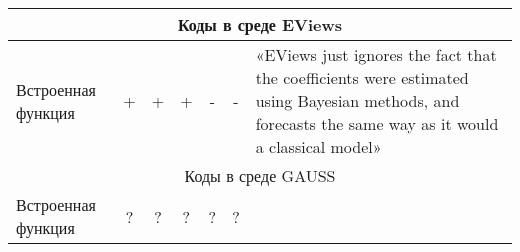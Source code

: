 \documentclass[11pt]{article} %
\begin{document}
\begin{landscape}
\begin{center}
\begin{tabular}{p{2cm}cccccp{10cm}}
 \\
\midrule
\multicolumn{7}{c}{Коды в среде EViews}\\
\midrule
Встроенная функция & + & + & + &- &- & «EViews just ignores the fact that the coefficients were estimated using Bayesian methods, and forecasts the same way as it would a classical model» \\
\midrule
\multicolumn{7}{c}{Коды в среде GAUSS}\\
\midrule
Встроенная функция & ? & ?& ?& ?&? & \\
\bottomrule
\end{tabular}
\end{center}
\end{landscape}
\end{document}
